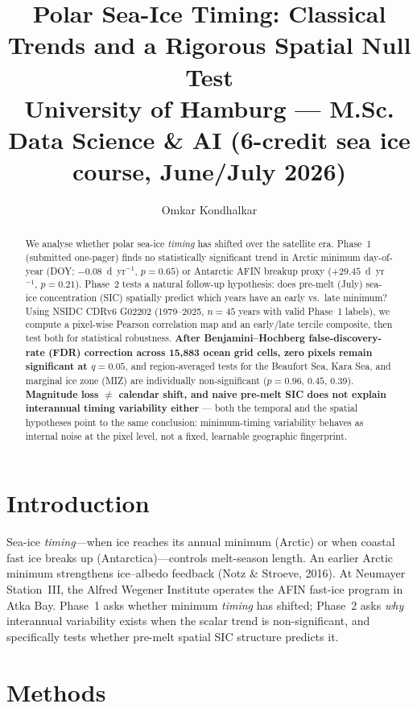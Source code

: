 \documentclass[11pt,a4paper]{article}
\title{\textbf{Polar Sea-Ice Timing: Classical Trends and a Rigorous Spatial Null Test}\\[0.4em]
\large University of Hamburg --- M.Sc. Data Science \& AI (6-credit sea ice course, June/July 2026)}
\author{Omkar Kondhalkar}
\date{}
\begin{document}
\maketitle

\begin{abstract}
We analyse whether polar sea-ice \emph{timing} has shifted over the satellite era. Phase~1 (submitted one-pager) finds no statistically significant trend in Arctic minimum day-of-year (DOY; $-0.08$~d~yr$^{-1}$, $p=0.65$) or Antarctic AFIN breakup proxy ($+29.45$~d~yr$^{-1}$, $p=0.21$). Phase~2 tests a natural follow-up hypothesis: does pre-melt (July) sea-ice concentration (SIC) spatially predict which years have an early vs.\ late minimum? Using NSIDC CDRv6 G02202 (1979--2025, $n=45$ years with valid Phase~1 labels), we compute a pixel-wise Pearson correlation map and an early/late tercile composite, then test both for statistical robustness. \textbf{After Benjamini--Hochberg false-discovery-rate (FDR) correction across 15{,}883 ocean grid cells, zero pixels remain significant at $q=0.05$}, and region-averaged tests for the Beaufort Sea, Kara Sea, and marginal ice zone (MIZ) are individually non-significant ($p=0.96$, $0.45$, $0.39$). \textbf{Magnitude loss $\neq$ calendar shift, and naive pre-melt SIC does not explain interannual timing variability either} --- both the temporal and the spatial hypotheses point to the same conclusion: minimum-timing variability behaves as internal noise at the pixel level, not a fixed, learnable geographic fingerprint.
\end{abstract}

\section{Introduction}
Sea-ice \emph{timing}---when ice reaches its annual minimum (Arctic) or when coastal fast ice breaks up (Antarctica)---controls melt-season length. An earlier Arctic minimum strengthens ice--albedo feedback (Notz \& Stroeve, 2016). At Neumayer Station~III, the Alfred Wegener Institute operates the AFIN fast-ice program in Atka Bay. Phase~1 asks whether minimum \emph{timing} has shifted; Phase~2 asks \emph{why} interannual variability exists when the scalar trend is non-significant, and specifically tests whether pre-melt spatial SIC structure predicts it.

\section{Methods}
\end{document}
